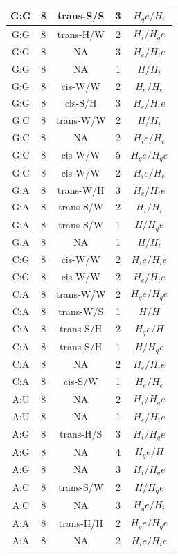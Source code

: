 \begin{center}
\begin{longtable}{c|c|c|c|c}
G:G & 8 & trans-S/S & 3 & $H_qe/H_i$ \\  \hline
G:G & 8 & trans-H/W & 2 & $H_i/H_qe$ \\  \hline
G:G & 8 & NA & 3 & $H_e/H_ie$ \\  \hline
G:G & 8 & NA & 1 & $H/H_i$ \\  \hline
G:G & 8 & cis-W/W & 2 & $H_e/H_e$ \\  \hline
G:G & 8 & cis-S/H & 3 & $H_e/H_ie$ \\  \hline
G:C & 8 & trans-W/W & 2 & $H/H_i$ \\  \hline
G:C & 8 & NA & 2 & $H_ie/H_e$ \\  \hline
G:C & 8 & cis-W/W & 5 & $H_qe/H_qe$ \\  \hline
G:C & 8 & cis-W/W & 2 & $H_ie/H_e$ \\  \hline
G:A & 8 & trans-W/H & 3 & $H_e/H_ie$ \\  \hline
G:A & 8 & trans-S/W & 2 & $H_i/H_i$ \\  \hline
G:A & 8 & trans-S/W & 1 & $H/H_qe$ \\  \hline
G:A & 8 & NA & 1 & $H/H_i$ \\  \hline
C:G & 8 & cis-W/W & 2 & $H_ie/H_ie$ \\  \hline
C:G & 8 & cis-W/W & 2 & $H_e/H_ie$ \\  \hline
C:A & 8 & trans-W/W & 2 & $H_qe/H_qe$ \\  \hline
C:A & 8 & trans-W/S & 1 & $H/H$ \\  \hline
C:A & 8 & trans-S/H & 2 & $H_qe/H$ \\  \hline
C:A & 8 & trans-S/H & 1 & $H/H_qe$ \\  \hline
C:A & 8 & NA & 2 & $H_e/H_ie$ \\  \hline
C:A & 8 & cis-S/W & 1 & $H_e/H_e$ \\  \hline
A:U & 8 & NA & 2 & $H_i/H_qe$ \\  \hline
A:U & 8 & NA & 1 & $H_e/H_ie$ \\  \hline
A:G & 8 & trans-H/S & 3 & $H_i/H_qe$ \\  \hline
A:G & 8 & NA & 4 & $H_qe/H$ \\  \hline
A:G & 8 & NA & 3 & $H_i/H_qe$ \\  \hline
A:C & 8 & trans-S/W & 2 & $H/H_qe$ \\  \hline
A:C & 8 & NA & 3 & $H_qe/H_i$ \\  \hline
A:A & 8 & trans-H/H & 2 & $H_qe/H_qe$ \\  \hline
A:A & 8 & NA & 2 & $H_ie/H_ie$ \\  \hline

\end{longtable}
\end{center}
